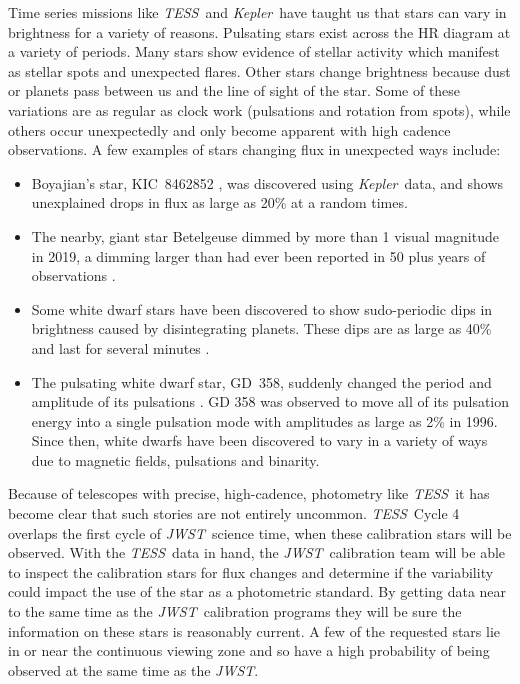 \documentclass[letterpaper,12pt]{article}
\newcommand{\tess}{{\it TESS}}
\newcommand{\jwst}{{\it JWST}}
\newcommand{\kepler}{{\it Kepler}}
\begin{document}
Time series missions like \tess\ and \kepler\ have taught us that stars can vary in brightness for a variety of reasons. Pulsating stars exist across the HR diagram at a variety of periods.  Many stars show evidence of stellar activity which manifest as stellar spots and unexpected flares. Other stars change brightness because dust or planets pass between us and the line of sight of the star. Some of these variations are as regular as clock work (pulsations and rotation from spots), while others occur unexpectedly and only become apparent with high cadence observations. A few examples of stars changing flux in unexpected ways include:
\begin{itemize}
    \item  Boyajian's star, KIC~8462852 \citep{Boyajian2016}, was discovered using \kepler\ data, and shows unexplained drops in flux as large as 20\% at a random times.
    \item The nearby, giant star Betelgeuse \citep{Guinan2019} dimmed by more than 1 visual magnitude in 2019, a dimming larger than had ever been reported in 50 plus years of observations \citep{Levesque2020ApJ}.
    \item Some white dwarf stars have been discovered to show sudo-periodic dips in brightness caused by disintegrating planets.  These dips are as large as 40\% and last for several minutes \citep{Vanderburg2015}.
    \item The pulsating white dwarf star, GD~358, suddenly changed the period and amplitude of its pulsations \citep{Montgomery2010}. GD 358 was observed to move all of its pulsation energy into a single pulsation mode with amplitudes as large as 2\% in 1996. Since then, white dwarfs have been discovered to vary in a variety of ways \citep{Hermes2017} due to magnetic fields, pulsations and binarity.
\end{itemize}

Because of telescopes with precise, high-cadence, photometry like \tess\, it has become clear that such stories are not entirely uncommon.  \tess\ Cycle 4 overlaps the first cycle of \jwst\ science time, when these calibration stars will be observed. With the \tess\ data in hand, the \jwst\ calibration team will be able to inspect the calibration stars for flux changes and determine if the variability could impact the use of the star as a photometric standard. By getting data near to the same time as the \jwst\ calibration programs they will be sure the information on these stars is reasonably current. A few of the requested stars lie in or near the continuous viewing zone and so have a high probability of being observed at the same time as the \jwst.
\end{document}
